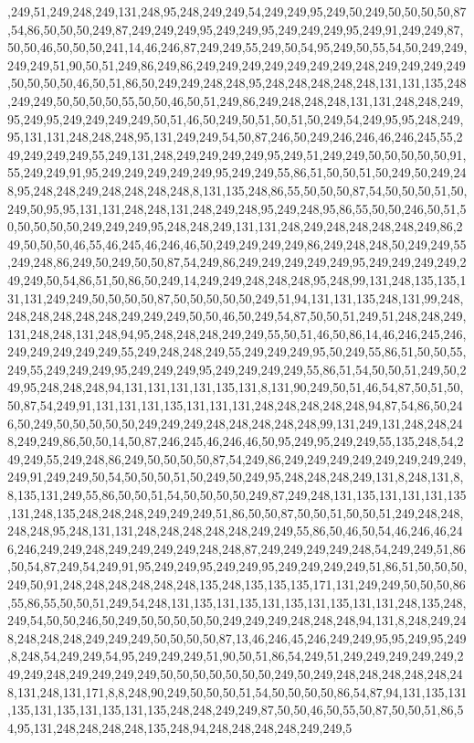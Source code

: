 ,249,51,249,248,249,131,248,95,248,249,249,54,249,249,95,249,50,249,50,50,50,50,87,54,86,50,50,50,249,87,249,249,249,95,249,249,95,249,249,249,95,249,91,249,249,87,50,50,46,50,50,50,241,14,46,246,87,249,249,55,249,50,54,95,249,50,55,54,50,249,249,249,249,51,90,50,51,249,86,249,86,249,249,249,249,249,249,249,248,249,249,249,249,50,50,50,50,46,50,51,86,50,249,249,248,248,95,248,248,248,248,248,131,131,135,248,249,249,50,50,50,50,55,50,50,46,50,51,249,86,249,248,248,248,131,131,248,248,249,95,249,95,249,249,249,249,50,51,46,50,249,50,51,50,51,50,249,54,249,95,95,248,249,95,131,131,248,248,248,95,131,249,249,54,50,87,246,50,249,246,246,46,246,245,55,249,249,249,249,55,249,131,248,249,249,249,249,95,249,51,249,249,50,50,50,50,50,91,55,249,249,91,95,249,249,249,249,249,95,249,249,55,86,51,50,50,51,50,249,50,249,248,95,248,248,249,248,248,248,248,8,131,135,248,86,55,50,50,50,87,54,50,50,50,51,50,249,50,95,95,131,131,248,248,131,248,249,248,95,249,248,95,86,55,50,50,246,50,51,50,50,50,50,50,249,249,249,95,248,248,249,131,131,248,249,248,248,248,248,249,86,249,50,50,50,46,55,46,245,46,246,46,50,249,249,249,249,86,249,248,248,50,249,249,55,249,248,86,249,50,249,50,50,87,54,249,86,249,249,249,249,249,95,249,249,249,249,249,249,50,54,86,51,50,86,50,249,14,249,249,248,248,248,95,248,99,131,248,135,135,131,131,249,249,50,50,50,50,87,50,50,50,50,50,249,51,94,131,131,135,248,131,99,248,248,248,248,248,248,249,249,249,50,50,46,50,249,54,87,50,50,51,249,51,248,248,249,131,248,248,131,248,94,95,248,248,248,249,249,55,50,51,46,50,86,14,46,246,245,246,249,249,249,249,249,55,249,248,248,249,55,249,249,249,95,50,249,55,86,51,50,50,55,249,55,249,249,249,95,249,249,249,95,249,249,249,249,55,86,51,54,50,50,51,249,50,249,95,248,248,248,94,131,131,131,131,135,131,8,131,90,249,50,51,46,54,87,50,51,50,50,87,54,249,91,131,131,131,135,131,131,131,248,248,248,248,248,94,87,54,86,50,246,50,249,50,50,50,50,50,249,249,249,248,248,248,248,248,99,131,249,131,248,248,248,249,249,86,50,50,14,50,87,246,245,46,246,46,50,95,249,95,249,249,55,135,248,54,249,249,55,249,248,86,249,50,50,50,50,87,54,249,86,249,249,249,249,249,249,249,249,249,91,249,249,50,54,50,50,50,51,50,249,50,249,95,248,248,248,249,131,8,248,131,8,8,135,131,249,55,86,50,50,51,54,50,50,50,50,249,87,249,248,131,135,131,131,131,135,131,248,135,248,248,248,249,249,249,51,86,50,50,87,50,50,51,50,50,51,249,248,248,248,248,95,248,131,131,248,248,248,248,248,249,249,55,86,50,46,50,54,46,246,46,246,246,249,249,248,249,249,249,249,248,248,87,249,249,249,249,248,54,249,249,51,86,50,54,87,249,54,249,91,95,249,249,95,249,249,95,249,249,249,249,51,86,51,50,50,50,249,50,91,248,248,248,248,248,248,135,248,135,135,135,171,131,249,249,50,50,50,86,55,86,55,50,50,51,249,54,248,131,135,131,135,131,135,131,135,131,131,248,135,248,249,54,50,50,246,50,249,50,50,50,50,50,249,249,249,248,248,248,94,131,8,248,249,248,248,248,248,249,249,249,50,50,50,50,87,13,46,246,45,246,249,249,95,95,249,95,249,8,248,54,249,249,54,95,249,249,249,51,90,50,51,86,54,249,51,249,249,249,249,249,249,249,248,249,249,249,249,50,50,50,50,50,50,50,249,50,249,248,248,248,248,248,248,131,248,131,171,8,8,248,90,249,50,50,50,51,54,50,50,50,50,86,54,87,94,131,135,131,135,131,135,131,135,131,135,248,248,249,249,87,50,50,46,50,55,50,87,50,50,51,86,54,95,131,248,248,248,248,135,248,94,248,248,248,248,249,249,5
